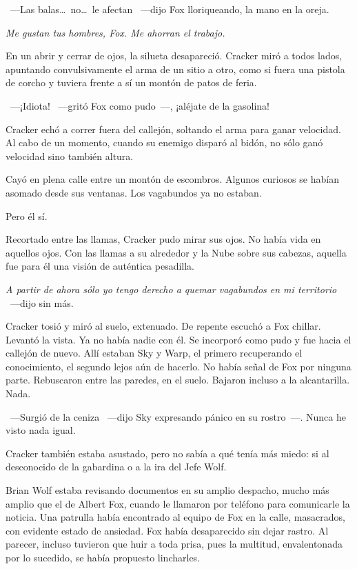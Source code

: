 ~---Las balas\dots\ no\dots\ le afectan ~---dijo Fox lloriqueando, la mano en la oreja.

\emph{Me gustan tus hombres, Fox. Me ahorran el trabajo.}

En un abrir y cerrar de ojos, la silueta desapareció. Cracker miró a todos lados, apuntando convulsivamente el arma de un sitio a otro, como si fuera una pistola de corcho y tuviera frente a sí un montón de patos de feria.

~---¡Idiota! ~---gritó Fox como pudo~---, ¡aléjate de la gasolina!

Cracker echó a correr fuera del callejón, soltando el arma para ganar velocidad. Al cabo de un momento, cuando su enemigo disparó al bidón, no sólo ganó velocidad sino también altura.

Cayó en plena calle entre un montón de escombros. Algunos curiosos se habían asomado desde sus ventanas. Los vagabundos ya no estaban.

Pero él sí.

Recortado entre las llamas, Cracker pudo mirar sus ojos. No había vida en aquellos ojos. Con las llamas a su alrededor y la Nube sobre sus cabezas, aquella fue para él una visión de auténtica pesadilla.

\emph{A partir de ahora sólo yo tengo derecho a quemar vagabundos en mi territorio} ~---dijo sin más.

Cracker tosió y miró al suelo, extenuado. De repente escuchó a Fox chillar. Levantó la vista. Ya no había nadie con él. Se incorporó como pudo y fue hacia el callejón de nuevo. Allí estaban Sky y Warp, el primero recuperando el conocimiento, el segundo lejos aún de hacerlo. No había señal de Fox por ninguna parte. Rebuscaron entre las paredes, en el suelo. Bajaron incluso a la alcantarilla. Nada.

~---Surgió de la ceniza ~---dijo Sky expresando pánico en su rostro~---. Nunca he visto nada igual.

Cracker también estaba asustado, pero no sabía a qué tenía más miedo: si al desconocido de la gabardina o a la ira del Jefe Wolf.

Brian Wolf estaba revisando documentos en su amplio despacho, mucho más amplio que el de Albert Fox, cuando le llamaron por teléfono para comunicarle la noticia. Una patrulla había encontrado al equipo de Fox en la calle, masacrados, con evidente estado de ansiedad. Fox había desaparecido sin dejar rastro. Al parecer, incluso tuvieron que huir a toda prisa, pues la multitud, envalentonada por lo sucedido, se había propuesto lincharles.

